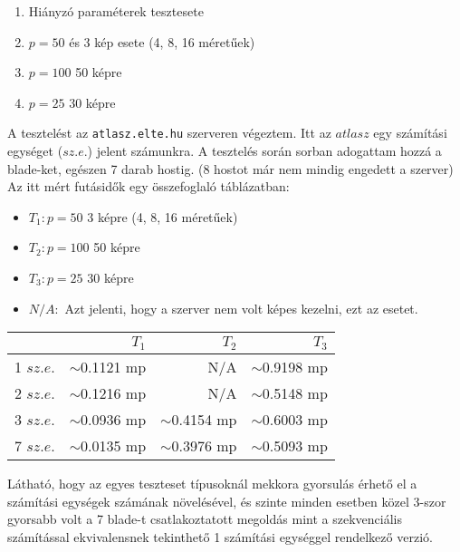 \documentclass[12pt]{article}
\begin{document}
\begin{enumerate}
    \item Hiányzó paraméterek tesztesete
    \item $p = 50$  és 3 kép esete (4, 8, 16 méretűek)
    \item $p = 100$ 50 képre
    \item $p = 25$ 30 képre
\end{enumerate}

A tesztelést az \verb|atlasz.elte.hu| szerveren végeztem. Itt az $atlasz$ egy számítási egységet ($sz.e.$) jelent számunkra.
A tesztelés során sorban adogattam hozzá a blade-ket, egészen 7 darab hostig. (8 hostot már nem mindig engedett a szerver)
Az itt mért futásidők egy összefoglaló táblázatban:

\begin{itemize}
    \item $T_1 : p = 50$ 3 képre (4, 8, 16 méretűek)
    \item $T_2 : p = 100$ 50 képre
    \item $T_3 : p = 25$ 30 képre
    \item $N/A :$ Azt jelenti, hogy a szerver nem volt képes kezelni, ezt az esetet.
\end{itemize}

\pagebreak

\begin{table}
\centering
  \begin{adjustbox}{max width=\textwidth}
      \begin{tabular}{| l | r | r | r |}
        \hline
         & $T_1$ & $T_2$ & $T_3$  \\ \hline
        1 $sz.e.$  & $\sim$0.1121 mp & N/A & $\sim$0.9198 mp \\ \hline
        2 $sz.e.$ & $\sim$0.1216 mp & N/A& $\sim$0.5148 mp  \\ \hline
        3 $sz.e.$ & $\sim$0.0936 mp & $\sim$0.4154 mp & $\sim$0.6003 mp  \\ \hline
        7 $sz.e.$ & $\sim$0.0135 mp & $\sim$0.3976 mp & $\sim$0.5093 mp \\  \hline
      \end{tabular}
  \end{adjustbox}
\end{table}


Látható, hogy az egyes teszteset típusoknál mekkora gyorsulás érhető el a számítási egységek számának növelésével, és szinte minden esetben közel 3-szor gyorsabb volt a 7 blade-t csatlakoztatott megoldás mint a szekvenciális számítással ekvivalensnek tekinthető 1 számítási egységgel rendelkező verzió.
\end{document}
